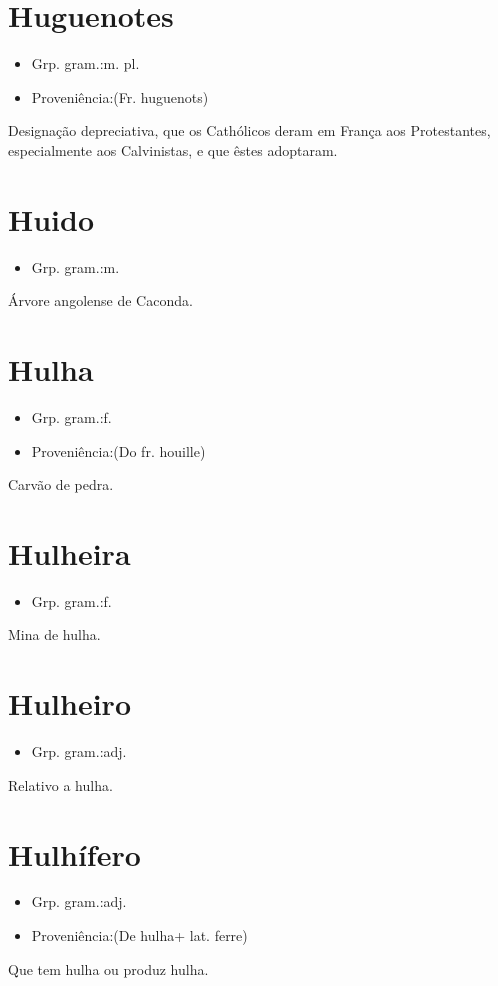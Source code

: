 \documentclass{article}
\begin{document}
\section{Huguenotes}
\begin{itemize}
\item {Grp. gram.:m. pl.}
\end{itemize}
\begin{itemize}
\item {Proveniência:(Fr. \textunderscore huguenots\textunderscore )}
\end{itemize}
Designação depreciativa, que os Cathólicos deram em França aos Protestantes, especialmente aos Calvinistas, e que êstes adoptaram.
\section{Huido}
\begin{itemize}
\item {Grp. gram.:m.}
\end{itemize}
Árvore angolense de Caconda.
\section{Hulha}
\begin{itemize}
\item {Grp. gram.:f.}
\end{itemize}
\begin{itemize}
\item {Proveniência:(Do fr. \textunderscore houille\textunderscore )}
\end{itemize}
Carvão de pedra.
\section{Hulheira}
\begin{itemize}
\item {Grp. gram.:f.}
\end{itemize}
Mina de hulha.
\section{Hulheiro}
\begin{itemize}
\item {Grp. gram.:adj.}
\end{itemize}
Relativo a hulha.
\section{Hulhífero}
\begin{itemize}
\item {Grp. gram.:adj.}
\end{itemize}
\begin{itemize}
\item {Proveniência:(De \textunderscore hulha\textunderscore  + lat. \textunderscore ferre\textunderscore )}
\end{itemize}
Que tem hulha ou produz hulha.
\end{document}
